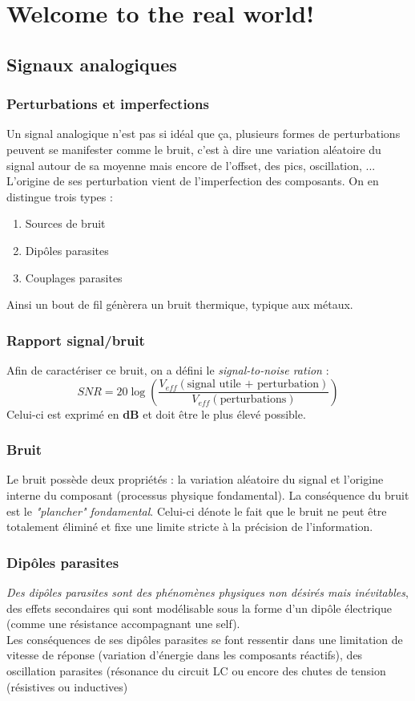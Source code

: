 \chapter{Welcome to the real world!}

\section{Signaux analogiques}
\subsection{Perturbations et imperfections}
Un signal analogique n'est pas si idéal que ça, plusieurs formes de perturbations peuvent se manifester comme le bruit, c'est à dire une variation aléatoire du signal autour de sa moyenne mais encore de l'offset, des pics, oscillation, ...\\
L'origine de ses perturbation vient de l'imperfection des composants. On en distingue trois types :
\begin{enumerate}
	\item Sources de bruit
	\item Dipôles parasites
	\item Couplages parasites
\end{enumerate}
Ainsi un bout de fil génèrera un bruit thermique, typique aux métaux.

\subsection{Rapport signal/bruit}
Afin de caractériser ce bruit, on a défini le \textit{signal-to-noise ration} :
\begin{equation}
	SNR = 20\log\left(\dfrac{V_{eff}(\text{signal utile + perturbation})}{V_{eff}(\text{perturbations})} \right)
\end{equation}
Celui-ci est exprimé en \textbf{dB} et doit être le plus élevé possible.

\subsection{Bruit}
Le bruit possède deux propriétés : la variation aléatoire du signal et l'origine interne du composant (processus physique fondamental). La conséquence du bruit est le \textit{"plancher" fondamental}. Celui-ci dénote le fait que le bruit ne peut être totalement éliminé et fixe une limite stricte à la précision de l'information.

\subsection{Dipôles parasites}
\textit{Des dipôles parasites sont des phénomènes physiques non désirés mais inévitables}, des effets secondaires qui sont modélisable sous la forme d'un dipôle électrique (comme une résistance accompagnant une self).\\
Les conséquences de ses dipôles parasites se font ressentir dans une limitation de vitesse de réponse (variation d'énergie dans les composants réactifs), des oscillation parasites (résonance du circuit LC ou encore des chutes de tension (résistives ou inductives)


